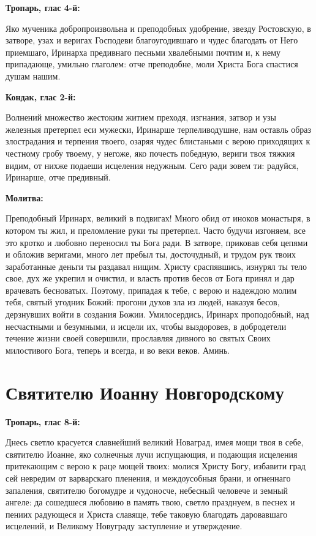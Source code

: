 \bfseries Тропарь, глас 4-й:\normalfont{}


Яко мученика добропроизвольна и преподобных удобрение, звезду Ростовскую, в затворе, узах и веригах Господеви благоугодившаго и чудес благодать от Него приемшаго, Иринарха предивнаго песньми хвалебными почтим и, к нему припадающе, умильно глаголем: отче преподобне, моли Христа Бога спастися душам нашим.


\medskip


\bfseries Кондак, глас 2-й:\normalfont{}


Волнений множество жестоким житием преходя, изгнания, затвор и узы железныя претерпел еси мужески, Иринарше терпеливодушне, нам оставль образ злострадания и терпения твоего, озаряя чудес блистаньми с верою приходящих к честному гробу твоему, у негоже, яко почесть победную, вериги твоя тяжкия видим, от нихже подаеши исцеления недужным. Сего ради зовем ти: радуйся, Иринарше, отче предивный.


\medskip


\bfseries Молитва:\normalfont{}


Преподобный Иринарх, великий в подвигах! Много обид от иноков монастыря, в котором ты жил, и преломление руки ты претерпел. Часто будучи изгоняем, все это кротко и любовно переносил ты Бога ради. В затворе, приковав себя цепями и обложив веригами, много лет пребыл ты, досточудный, и трудом рук твоих заработанные деньги ты раздавал нищим. Христу сраспявшись, изнурял ты тело свое, дух же укрепил и очистил, и власть против бесов от Бога принял и дар врачевать бесноватых. Поэтому, припадая к тебе, с верою и надеждою молим тебя, святый угодник Божий: прогони духов зла из людей, наказуя бесов, дерзнувших войти в создания Божии. Умилосердись, Иринарх проподобный, над несчастными и безумными, и исцели их, чтобы выздоровев, в добродетели течение жизни своей совершили, прославляя дивного во святых Своих милостивого Бога, теперь и всегда, и во веки веков. Аминь.


\section{Святителю Иоанну Новгородскому}
 



\bfseries Тропарь, глас 8-й:\normalfont{}


  Днесь светло красуется славнейший великий Новаград, имея мощи твоя в себе, святителю Иоанне, яко солнечныя лучи испущающия, и подающия исцеления притекающим с верою к раце мощей твоих: молися Христу Богу, избавити град сей невредим от варварскаго пленения, и междоусобныя брани, и огненнаго запаления, святителю богомудре и чудоносче, небесный человече и земный ангеле: да сошедшеся любовию в память твою, светло празднуем, в песнех и пениих радующеся и Христа славяще, тебе таковую благодать даровавшаго исцелений, и Bеликому Новуграду заступление и утверждение. 


